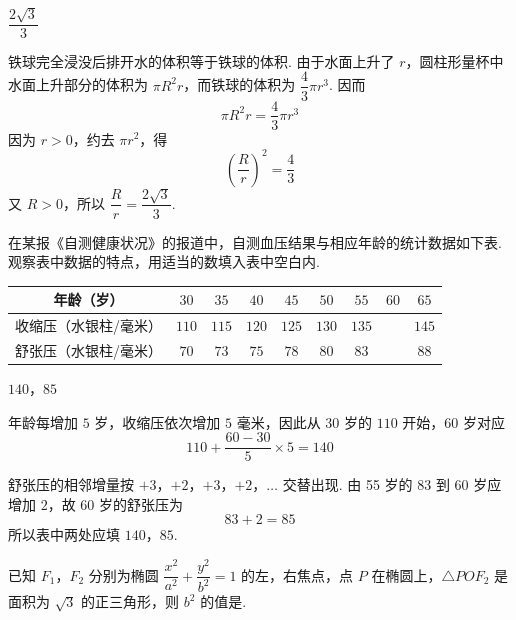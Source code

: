 \begin{answer}
\(\dfrac{2\sqrt3}{3}\)
\end{answer}

\begin{solution}
铁球完全浸没后排开水的体积等于铁球的体积. 由于水面上升了 \(r\)，圆柱形量杯中水面上升部分的体积为 \(\pi R^2r\)，而铁球的体积为 \(\dfrac43\pi r^3\). 因而
\[
\pi R^2r=\dfrac43\pi r^3
\]
因为 \(r>0\)，约去 \(\pi r^2\)，得
\[
\left(\dfrac Rr\right)^2=\dfrac43
\]
又 \(R>0\)，所以 \(\dfrac Rr=\dfrac{2\sqrt3}{3}\).
\end{solution}

\begin{problem}
在某报《自测健康状况》的报道中，自测血压结果与相应年龄的统计数据如下表. 观察表中数据的特点，用适当的数填入表中空白内.

\begin{center}
\small
\begin{tabular}{|c|c|c|c|c|c|c|c|c|}
\hline
年龄（岁） & \(30\) & \(35\) & \(40\) & \(45\) & \(50\) & \(55\) & \(60\) & \(65\) \\
\hline
收缩压（水银柱/毫米） & \(110\) & \(115\) & \(120\) & \(125\) & \(130\) & \(135\) &\fillinblank{} & \(145\) \\
\hline
舒张压（水银柱/毫米） & \(70\) & \(73\) & \(75\) & \(78\) & \(80\) & \(83\) &\fillinblank{} & \(88\) \\
\hline
\end{tabular}
\end{center}

\end{problem}

\begin{answer}
\(140\)，\(85\)
\end{answer}

\begin{solution}
年龄每增加 \(5\) 岁，收缩压依次增加 \(5\) 毫米，因此从 30 岁的 \(110\) 开始，60 岁对应
\[
110+\dfrac{60-30}{5}\times5=140
\]

舒张压的相邻增量按 \(+3\)，\(+2\)，\(+3\)，\(+2\)，\(\ldots\) 交替出现. 由 55 岁的 \(83\) 到 60 岁应增加 \(2\)，故 60 岁的舒张压为
\[
83+2=85
\]
所以表中两处应填 \(140\)，\(85\).
\end{solution}

\begin{problem}
已知 \(F_{1}\)，\(F_{2}\) 分别为椭圆 \(\dfrac{x^{2}}{a^{2}}+\dfrac{y^{2}}{b^{2}}=1\) 的左，右焦点，点 \(P\) 在椭圆上，\(\triangle POF_{2}\) 是面积为 \(\sqrt3\) 的正三角形，则 \(b^{2}\) 的值是\fillinblank{}.
\end{problem}

